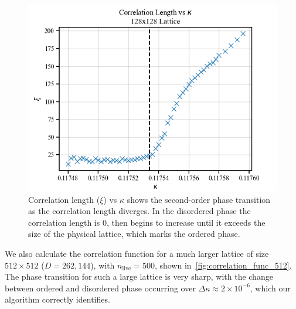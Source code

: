 \documentclass[11pt]{article}
\begin{document}
    \begin{figure}[h!]
        \center
        \includegraphics[width=\linewidth]{../figures/CorrelationLength}
        \caption{
            Correlation length ($\xi$) vs $\kappa$ shows the second-order phase transition as the correlation length
            diverges.
            In the disordered phase the correlation length is 0, then begins to increase until it
            exceeds the size of the physical lattice, which marks the ordered phase.
        }\label{fig:correlation_length}
    \end{figure}

    We also calculate the correlation function for a much larger lattice of size $512 \times 512$ ($D=262,144$),
    with $n_{\text{live}} = 500$, shown in~\cref{fig:correlation_func_512}.
    The phase transition for such a large lattice is very sharp, with the change between ordered and disordered phase
    occurring over $\Delta \kappa \approx 2 \times 10^{-6}$, which our algorithm correctly identifies.
\end{document}
